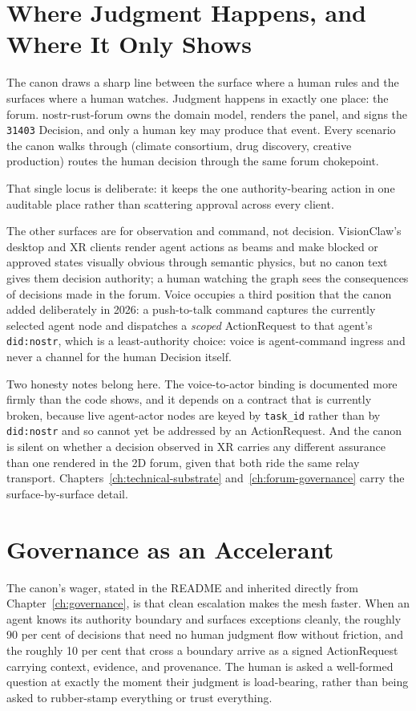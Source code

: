 \section{Where Judgment Happens, and Where It Only Shows}

The canon draws a sharp line between the surface where a human rules and the surfaces where a human watches. Judgment happens in exactly one place: the forum. nostr-rust-forum owns the domain model, renders the panel, and signs the \texttt{31403} Decision, and only a human key may produce that event. Every scenario the canon walks through (climate consortium, drug discovery, creative production) routes the human decision through the same forum chokepoint.

That single locus is deliberate: it keeps the one authority-bearing action in one auditable place rather than scattering approval across every client.

The other surfaces are for observation and command, not decision. VisionClaw's desktop and XR clients render agent actions as beams and make blocked or approved states visually obvious through semantic physics, but no canon text gives them decision authority; a human watching the graph sees the consequences of decisions made in the forum. Voice occupies a third position that the canon added deliberately in 2026: a push-to-talk command captures the currently selected agent node and dispatches a \emph{scoped} ActionRequest to that agent's \texttt{did:nostr}, which is a least-authority choice: voice is agent-command ingress and never a channel for the human Decision itself.

Two honesty notes belong here. The voice-to-actor binding is documented more firmly than the code shows, and it depends on a contract that is currently broken, because live agent-actor nodes are keyed by \texttt{task\_id} rather than by \texttt{did:nostr} and so cannot yet be addressed by an ActionRequest. And the canon is silent on whether a decision observed in XR carries any different assurance than one rendered in the 2D forum, given that both ride the same relay transport. Chapters~\ref{ch:technical-substrate} and~\ref{ch:forum-governance} carry the surface-by-surface detail.

\section{Governance as an Accelerant}

The canon's wager, stated in the README and inherited directly from Chapter~\ref{ch:governance}, is that clean escalation makes the mesh faster. When an agent knows its authority boundary and surfaces exceptions cleanly, the roughly 90 per cent of decisions that need no human judgment flow without friction, and the roughly 10 per cent that cross a boundary arrive as a signed ActionRequest carrying context, evidence, and provenance. The human is asked a well-formed question at exactly the moment their judgment is load-bearing, rather than being asked to rubber-stamp everything or trust everything.

